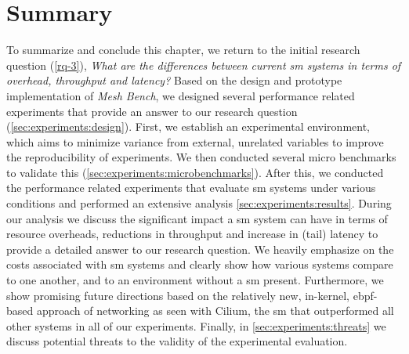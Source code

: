 \section{Summary}
\label{sec:experiments:summary}




To summarize and conclude this chapter, we return to the initial research question (\ref{rq-3}), \textit{What are the differences between current \gls{sm} systems in terms of overhead, throughput and latency?} Based on the design and prototype implementation of \textit{Mesh Bench}, we designed several performance related experiments that provide an answer to our research question (\cref{sec:experiments:design}). First, we establish an experimental environment, which aims to minimize variance from external, unrelated variables to improve the reproducibility of experiments. We then conducted several micro benchmarks to validate this (\cref{sec:experiments:microbenchmarks}). After this, we conducted the performance related experiments that evaluate \gls{sm} systems under various conditions and performed an extensive analysis \cref{sec:experiments:results}. During our analysis we discuss the significant impact a \gls{sm} system can have in terms of resource overheads, reductions in throughput and increase in (tail) latency to provide a detailed answer to our research question. We heavily emphasize on the costs associated with \gls{sm} systems and clearly show how various systems compare to one another, and to an environment without a \gls{sm} present. Furthermore, we show promising future directions based on the relatively new, in-kernel, \gls{ebpf}-based approach of networking as seen with Cilium, the \gls{sm} that outperformed all other systems in all of our experiments. Finally, in \cref{sec:experiments:threats} we discuss potential threats to the validity of the experimental evaluation.





